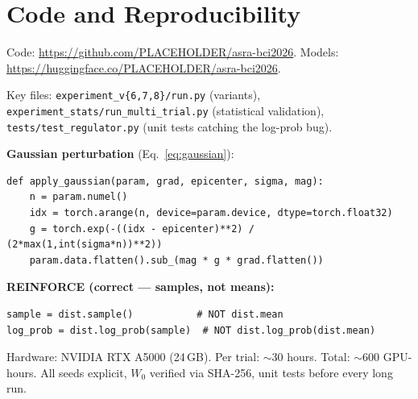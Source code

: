 \documentclass[runningheads]{llncs}
\begin{document}
\FloatBarrier
\appendix
\section{Code and Reproducibility}
\label{sec:appendix}

Code: \url{https://github.com/PLACEHOLDER/asra-bci2026}. Models: \url{https://huggingface.co/PLACEHOLDER/asra-bci2026}.

Key files: \texttt{experiment\_v\{6,7,8\}/run.py} (variants), \texttt{experiment\_stats/run\_multi\_trial.py} (statistical validation), \texttt{tests/test\_regulator.py} (unit tests catching the log-prob bug).

\textbf{Gaussian perturbation} (Eq.~\ref{eq:gaussian}):
\begin{verbatim}
def apply_gaussian(param, grad, epicenter, sigma, mag):
    n = param.numel()
    idx = torch.arange(n, device=param.device, dtype=torch.float32)
    g = torch.exp(-((idx - epicenter)**2) / (2*max(1,int(sigma*n))**2))
    param.data.flatten().sub_(mag * g * grad.flatten())
\end{verbatim}

\textbf{REINFORCE (correct --- samples, not means):}
\begin{verbatim}
sample = dist.sample()           # NOT dist.mean
log_prob = dist.log_prob(sample)  # NOT dist.log_prob(dist.mean)
\end{verbatim}

Hardware: NVIDIA RTX A5000 (24\,GB). Per trial: $\sim$30 hours. Total: $\sim$600 GPU-hours. All seeds explicit, $W_0$ verified via SHA-256, unit tests before every long run.
\end{document}
